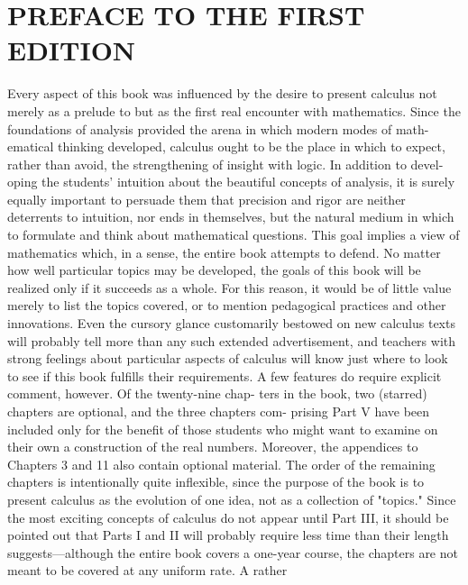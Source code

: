 \section*{}
\section*{PREFACE TO THE FIRST EDITION}

Every aspect of this book was influenced by the desire to present calculus not
merely as a prelude to but as the first real encounter with mathematics. Since
the foundations of analysis provided the arena in which modern modes of math-
ematical thinking developed, calculus ought to be the place in which to expect,
rather than avoid, the strengthening of insight with logic. In addition to devel-
oping the students' intuition about the beautiful concepts of analysis, it is surely
equally important to persuade them that precision and rigor are neither deterrents
to intuition, nor ends in themselves, but the natural medium in which to formulate
and think about mathematical questions.
This goal implies a view of mathematics which, in a sense, the entire book
attempts to defend. No matter how well particular topics may be developed, the
goals of this book will be realized only if it succeeds as a whole. For this reason, it
would be of little value merely to list the topics covered, or to mention pedagogical
practices and other innovations. Even the cursory glance customarily bestowed on
new calculus texts will probably tell more than any such extended advertisement,
and teachers with strong feelings about particular aspects of calculus will know just
where to look to see if this book fulfills their requirements.
A few features do require explicit comment, however. Of the twenty-nine chap-
ters in the book, two (starred) chapters are optional, and the three chapters com-
prising Part V have been included only for the benefit of those students who might
want to examine on their own a construction of the real numbers. Moreover, the
appendices to Chapters 3 and 11 also contain optional material.
The order of the remaining chapters is intentionally quite inflexible, since the
purpose of the book is to present calculus as the evolution of one idea, not as a
collection of "topics." Since the most exciting concepts of calculus do not appear
until Part III, it should be pointed out that Parts I and II will probably require
less time than their length suggests—although the entire book covers a one-year
course, the chapters are not meant to be covered at any uniform rate. A rather
